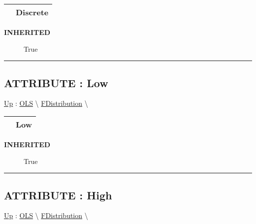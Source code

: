{\renewcommand{\arraystretch}{1.5}
\begin{tabularx}{\textwidth}{|>{\raggedright\arraybackslash}l|X|}
\hline
\hspace{0pt} & Discrete \\
\hline
\end{tabularx}
}

\par

\par
\begin{description}
\item [\textbf{INHERITED}] True
\end{description}

\rule{\linewidth}{0.5pt}
\subsection*{ATTRIBUTE : Low}
\hypertarget{ecldoc:linearregression.ols.fdistribution.low}{}
\hyperlink{ecldoc:linearregression.ols.fdistribution}{Up} :
\hspace{0pt} \hyperlink{ecldoc:linearregression.ols}{OLS} \textbackslash 
\hspace{0pt} \hyperlink{ecldoc:linearregression.ols.fdistribution}{FDistribution} \textbackslash 

{\renewcommand{\arraystretch}{1.5}
\begin{tabularx}{\textwidth}{|>{\raggedright\arraybackslash}l|X|}
\hline
\hspace{0pt} & Low \\
\hline
\end{tabularx}
}

\par

\par
\begin{description}
\item [\textbf{INHERITED}] True
\end{description}

\rule{\linewidth}{0.5pt}
\subsection*{ATTRIBUTE : High}
\hypertarget{ecldoc:linearregression.ols.fdistribution.high}{}
\hyperlink{ecldoc:linearregression.ols.fdistribution}{Up} :
\hspace{0pt} \hyperlink{ecldoc:linearregression.ols}{OLS} \textbackslash 
\hspace{0pt} \hyperlink{ecldoc:linearregression.ols.fdistribution}{FDistribution} \textbackslash 

